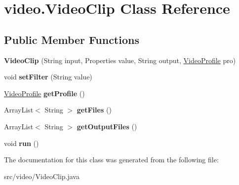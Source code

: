 \hypertarget{classvideo_1_1_video_clip}{
\section{video.VideoClip Class Reference}
\label{classvideo_1_1_video_clip}
}
\subsection*{Public Member Functions}
\begin{DoxyCompactItemize}
\item 
\hypertarget{classvideo_1_1_video_clip_af86707967ac07f4362908d37bef33d69}{
{\bfseries VideoClip} (String input, Properties value, String output, \hyperlink{classvideo_1_1_video_profile}{VideoProfile} pro)}
\label{classvideo_1_1_video_clip_af86707967ac07f4362908d37bef33d69}

\item 
\hypertarget{classvideo_1_1_video_clip_a2c5f4f33dd9f104f2c1a65111fe8d04c}{
void {\bfseries setFilter} (String value)}
\label{classvideo_1_1_video_clip_a2c5f4f33dd9f104f2c1a65111fe8d04c}

\item 
\hypertarget{classvideo_1_1_video_clip_ad2e8fe4c67eb2e1b545fece12a745cb8}{
\hyperlink{classvideo_1_1_video_profile}{VideoProfile} {\bfseries getProfile} ()}
\label{classvideo_1_1_video_clip_ad2e8fe4c67eb2e1b545fece12a745cb8}

\item 
\hypertarget{classvideo_1_1_video_clip_a6e22c3a56e9603452a2c721af287ed07}{
ArrayList$<$ String $>$ {\bfseries getFiles} ()}
\label{classvideo_1_1_video_clip_a6e22c3a56e9603452a2c721af287ed07}

\item 
\hypertarget{classvideo_1_1_video_clip_ad3919b7bd7ec888f71cf309ad1f3f06a}{
ArrayList$<$ String $>$ {\bfseries getOutputFiles} ()}
\label{classvideo_1_1_video_clip_ad3919b7bd7ec888f71cf309ad1f3f06a}

\item 
\hypertarget{classvideo_1_1_video_clip_a3d5847a20be26fb0be1891bb8ebf30a3}{
void {\bfseries run} ()}
\label{classvideo_1_1_video_clip_a3d5847a20be26fb0be1891bb8ebf30a3}

\end{DoxyCompactItemize}


The documentation for this class was generated from the following file:\begin{DoxyCompactItemize}
\item 
src/video/VideoClip.java\end{DoxyCompactItemize}
